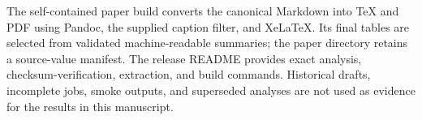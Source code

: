 \documentclass[
  12pt,
]{article}
\begin{document}
The self-contained paper build converts the canonical Markdown into TeX
and PDF using Pandoc, the supplied caption filter, and XeLaTeX. Its
final tables are selected from validated machine-readable summaries; the
paper directory retains a source-value manifest. The release README
provides exact analysis, checksum-verification, extraction, and build
commands. Historical drafts, incomplete jobs, smoke outputs, and
superseded analyses are not used as evidence for the results in this
manuscript.
\end{document}
